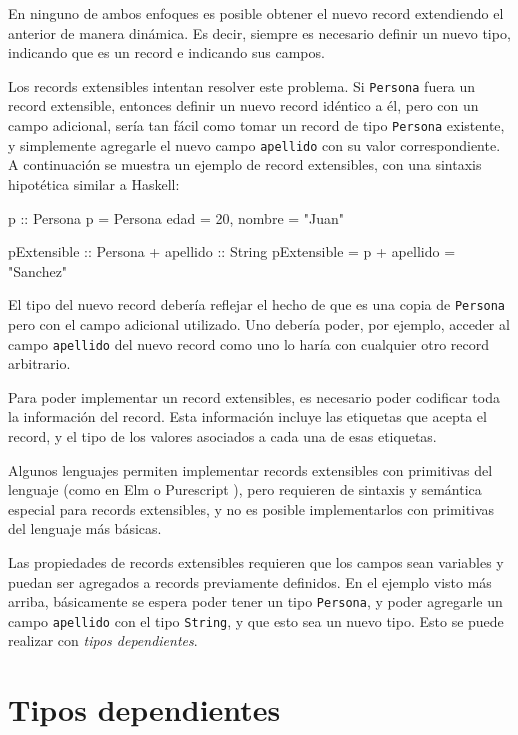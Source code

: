 En ninguno de ambos enfoques es posible obtener el nuevo record extendiendo el anterior de manera dinámica. Es decir, siempre es necesario definir un nuevo tipo, indicando que es un record e indicando sus campos.

Los records extensibles intentan resolver este problema. Si \texttt{Persona} fuera un record extensible, entonces definir un nuevo record idéntico a él, pero con un campo adicional, sería tan fácil como tomar un record de tipo \texttt{Persona} existente, y simplemente agregarle el nuevo campo \texttt{apellido} con su valor correspondiente. A continuación se muestra un ejemplo de record extensibles, con una sintaxis hipotética similar a Haskell:

\begin{code}
p :: Persona
p = Persona { edad = 20, nombre = "Juan" }

pExtensible :: Persona + { apellido :: String }
pExtensible = p + { apellido = "Sanchez" }
\end{code}

El tipo del nuevo record debería reflejar el hecho de que es una copia de \texttt{Persona} pero con el campo adicional utilizado. Uno debería poder, por ejemplo, acceder al campo \texttt{apellido} del nuevo record como uno lo haría con cualquier otro record arbitrario.

Para poder implementar un record extensibles, es necesario poder codificar toda la información del record. Esta información incluye las etiquetas que acepta el record, y el tipo de los valores asociados a cada una de esas etiquetas.

Algunos lenguajes permiten implementar records extensibles con primitivas del lenguaje (como en Elm \cite{ElmRecords} o Purescript \cite{PurescriptRecords}), pero requieren de sintaxis y semántica especial para records extensibles, y no es posible implementarlos con primitivas del lenguaje más básicas.

Las propiedades de records extensibles requieren que los campos sean variables y puedan ser agregados a records previamente definidos. En el ejemplo visto más arriba, básicamente se espera poder tener un tipo \texttt{Persona}, y poder agregarle un campo \texttt{apellido} con el tipo \texttt{String}, y que esto sea un nuevo tipo. Esto se puede realizar con \textit{tipos dependientes}.

\section{Tipos dependientes}

